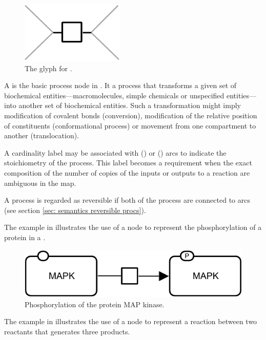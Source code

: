 \begin{figure}[H]
  \centering
  \includegraphics{images/process}
  \caption{The \PD glyph for .}
  \label{fig:process}
\end{figure}

A  is the basic process node in \PD.  It  a process that transforms a given set of biochemical entities---macromolecules, simple chemicals or unspecified entities---into another set of biochemical entities.  Such a transformation might imply modification of covalent bonds (conversion), modification of the relative position of constituents (conformational process) or movement from one compartment to another (translocation).

A cardinality label may be associated with  () or  () arcs to indicate the stoichiometry of the process.  This label becomes a requirement when the exact composition of the number of copies of the inputs or outputs to a reaction are ambiguous in the map.

A process is regarded as reversible if both  of the process are connected to  arcs (see section \ref{sec: semantics reversible procs}).

The example in  illustrates the use of a  node to represent the phosphorylation of a protein in a \PD.

\begin{figure}[H]
  \centering
  \includegraphics[scale = 0.8]{examples/process-phosphorylation}
  \caption{Phosphorylation of the protein MAP kinase.}
  \label{fig:trans-phos}
\end{figure}

The example in  illustrates the use of a  node to represent a reaction between two reactants that generates three products. 

